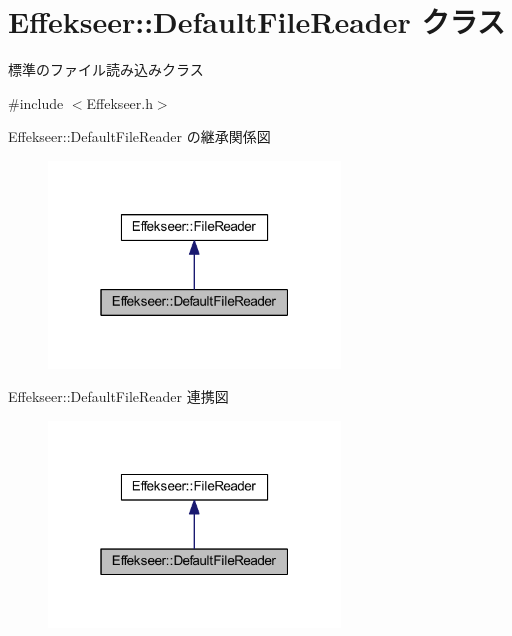 \hypertarget{class_effekseer_1_1_default_file_reader}{}\section{Effekseer\+:\+:Default\+File\+Reader クラス}
\label{class_effekseer_1_1_default_file_reader}


標準のファイル読み込みクラス  




{\ttfamily \#include $<$Effekseer.\+h$>$}



Effekseer\+:\+:Default\+File\+Reader の継承関係図\nopagebreak
\begin{figure}[H]
\begin{center}
\leavevmode
\includegraphics[width=220pt]{class_effekseer_1_1_default_file_reader__inherit__graph}
\end{center}
\end{figure}


Effekseer\+:\+:Default\+File\+Reader 連携図\nopagebreak
\begin{figure}[H]
\begin{center}
\leavevmode
\includegraphics[width=220pt]{class_effekseer_1_1_default_file_reader__coll__graph}
\end{center}
\end{figure}
